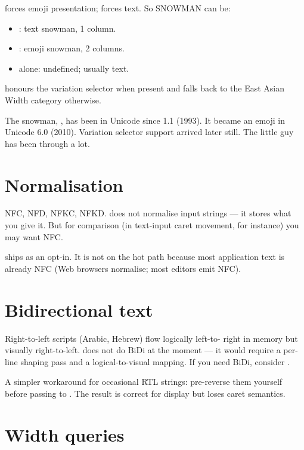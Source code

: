  forces emoji presentation;  forces
text. So  SNOWMAN can be:

\begin{itemize}[leftmargin=*]
  \item {}: text snowman, 1 column.
  \item {}: emoji snowman, 2 columns.
  \item {} alone: undefined; usually text.
\end{itemize}

\maya{} honours the variation selector when present and falls back
to the East Asian Width category otherwise.

\begin{funfact}
The snowman, , has been in Unicode since 1.1
(1993). It became an emoji in Unicode 6.0 (2010). Variation
selector support arrived later still. The little guy has been
through a lot.
\end{funfact}

\section{Normalisation}

NFC, NFD, NFKC, NFKD. \maya{} does not normalise input strings
--- it stores what you give it. But for comparison (in text-input
caret movement, for instance) you may want NFC.

\maya{} ships  as an opt-in. It
is not on the hot path because most application text is already
NFC (Web browsers normalise; most editors emit NFC).

\section{Bidirectional text}

Right-to-left scripts (Arabic, Hebrew) flow logically left-to-
right in memory but visually right-to-left. \maya{} does not do
BiDi at the moment --- it would require a per-line shaping pass
and a logical-to-visual mapping. If you need BiDi, consider
.

A simpler workaround for occasional RTL strings: pre-reverse them
yourself before passing to \maya{}. The result is correct for
display but loses caret semantics.

\section{Width queries}

